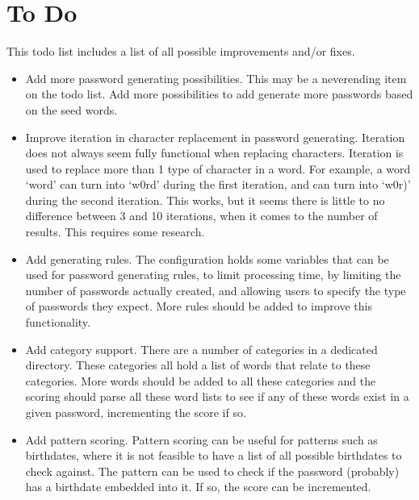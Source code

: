 \documentclass[letterpaper,10pt,english]{sphinxmanual}
\begin{document}
\section{To Do}
\label{\detokenize{development:to-do}}
\sphinxAtStartPar
This to\sphinxhyphen{}do list includes a list of all possible improvements and/or fixes.
\begin{itemize}
\item {} 
\sphinxAtStartPar
Add more password generating possibilities.
This may be a never\sphinxhyphen{}ending item on the to\sphinxhyphen{}do list. Add more possibilities to add generate more passwords based on the seed words.

\item {} 
\sphinxAtStartPar
Improve iteration in character replacement in password generating.
Iteration does not always seem fully functional when replacing characters. Iteration is used to replace more than 1 type of character in a word. For example, a word ‘word’ can turn into ‘w0rd’ during the first iteration, and can turn into ‘w0r)’ during the second iteration. This works, but it seems there is little to no difference between 3 and 10 iterations, when it comes to the number of results. This requires some research.

\item {} 
\sphinxAtStartPar
Add generating rules.
The configuration holds some variables that can be used for password generating rules, to limit processing time, by limiting the number of passwords actually created, and allowing users to specify the type of passwords they expect. More rules should be added to improve this functionality.

\item {} 
\sphinxAtStartPar
Add category support.
There are a number of categories in a dedicated directory. These categories all hold a list of words that relate to these categories. More words should be added to all these categories and the scoring should parse all these word lists to see if any of these words exist in a given password, incrementing the score if so.

\item {} 
\sphinxAtStartPar
Add pattern scoring.
Pattern scoring can be useful for patterns such as birthdates, where it is not feasible to have a list of all possible birthdates to check against. The pattern can be used to check if the password (probably) has a birthdate embedded into it. If so, the score can be incremented.

\end{itemize}
\end{document}
